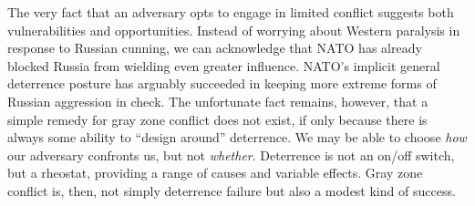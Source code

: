 \documentclass[11pt,letterpaper,pdftex,dvipsnames,table]{article}
\begin{document}
The very fact that an adversary opts to engage in limited conflict suggests both vulnerabilities and opportunities. Instead of worrying about Western paralysis in response to Russian cunning, we can acknowledge that NATO has already blocked Russia from wielding even greater influence. NATO's implicit general deterrence posture has arguably succeeded in keeping more extreme forms of Russian aggression in check. The unfortunate fact remains, however, that a simple remedy for gray zone conflict does not exist, if only because there is always some ability to ``design around''  deterrence. We may be able to choose \textit{how} our adversary confronts us, but not \textit{whether}. Deterrence is not an on/off switch, but a rheostat, providing a range of causes and variable effects. Gray zone conflict is, then, not simply deterrence failure but also a modest kind of success.

\newpage


\end{document}
